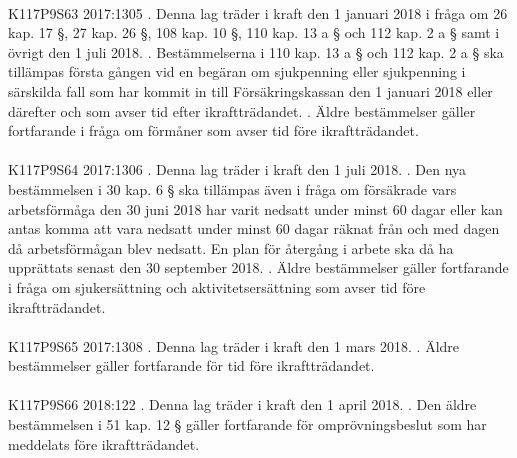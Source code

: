 \documentclass[a4paper,notitlepage,openany,10pt]{book}
\begin{document}
\paragraph*{}
{\tiny K117P9S63}
2017:1305
. Denna lag träder i kraft den 1 januari 2018 i fråga om 26 kap. 17 §, 27 kap. 26 §, 108 kap. 10 §, 110 kap. 13 a § och 112 kap. 2 a § samt i övrigt den 1 juli 2018.
. Bestämmelserna i 110 kap. 13 a § och 112 kap. 2 a § ska tillämpas första gången vid en begäran om sjukpenning eller sjukpenning i särskilda fall som har kommit in till Försäkringskassan den 1 januari 2018 eller därefter och som avser tid efter ikraftträdandet.
. Äldre bestämmelser gäller fortfarande i fråga om förmåner som avser tid före ikraftträdandet.
\paragraph*{}
{\tiny K117P9S64}
2017:1306
. Denna lag träder i kraft den 1 juli 2018.
. Den nya bestämmelsen i 30 kap. 6 § ska tillämpas även i fråga om försäkrade vars arbetsförmåga den 30 juni 2018 har varit nedsatt under minst 60 dagar eller kan antas komma att vara nedsatt under minst 60 dagar räknat från och med dagen då arbetsförmågan blev nedsatt. En plan för återgång i arbete ska då ha upprättats senast den 30 september 2018.
. Äldre bestämmelser gäller fortfarande i fråga om sjukersättning och aktivitetsersättning som avser tid före ikraftträdandet.
\paragraph*{}
{\tiny K117P9S65}
2017:1308
. Denna lag träder i kraft den 1 mars 2018.
. Äldre bestämmelser gäller fortfarande för tid före ikraftträdandet.
\paragraph*{}
{\tiny K117P9S66}
2018:122
. Denna lag träder i kraft den 1 april 2018.
. Den äldre bestämmelsen i 51 kap. 12 § gäller fortfarande för omprövningsbeslut som har meddelats före ikraftträdandet.
\end{document}
